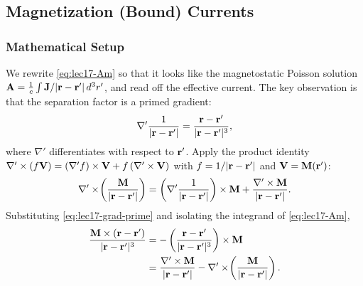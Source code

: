 \subsection{Magnetization (Bound) Currents}\label{subsec:lec17-bound-currents}

\subsubsection*{Mathematical Setup}
We rewrite \eqref{eq:lec17-Am} so that it looks like the magnetostatic Poisson solution
$\mathbf{A}=\tfrac1c\int \mathbf{J}/|\mathbf{r}-\mathbf{r}'|\,d^3r'$, and read off the effective current.  The
key observation is that the separation factor is a primed gradient:
\begin{equation}\label{eq:lec17-grad-prime}
  \nabla'\frac{1}{|\mathbf{r}-\mathbf{r}'|}=\frac{\mathbf{r}-\mathbf{r}'}{|\mathbf{r}-\mathbf{r}'|^3},
\end{equation}
where $\nabla'$ differentiates with respect to $\mathbf{r}'$.  Apply the product identity
$\nabla'\times(f\mathbf{V})=(\nabla' f)\times\mathbf{V}+f\,(\nabla'\times\mathbf{V})$ with
$f=1/|\mathbf{r}-\mathbf{r}'|$ and $\mathbf{V}=\mathbf{M}(\mathbf{r}')$:
\begin{equation}\label{eq:lec17-product-identity}
  \nabla'\times\!\left(\frac{\mathbf{M}}{|\mathbf{r}-\mathbf{r}'|}\right)
  =\left(\nabla'\frac{1}{|\mathbf{r}-\mathbf{r}'|}\right)\times\mathbf{M}
  +\frac{\nabla'\times\mathbf{M}}{|\mathbf{r}-\mathbf{r}'|}.
\end{equation}
Substituting \eqref{eq:lec17-grad-prime} and isolating the integrand of
\eqref{eq:lec17-Am},
\begin{align}
  \frac{\mathbf{M}\times(\mathbf{r}-\mathbf{r}')}{|\mathbf{r}-\mathbf{r}'|^3}
  &=-\left(\frac{\mathbf{r}-\mathbf{r}'}{|\mathbf{r}-\mathbf{r}'|^3}\right)\times\mathbf{M}
  \notag\\
  &=\frac{\nabla'\times\mathbf{M}}{|\mathbf{r}-\mathbf{r}'|}
  -\nabla'\times\!\left(\frac{\mathbf{M}}{|\mathbf{r}-\mathbf{r}'|}\right).
  \label{eq:lec17-integrand-rewrite}
\end{align}

